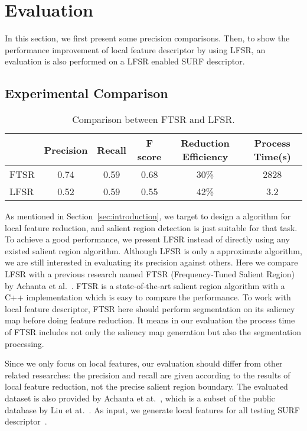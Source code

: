 \section{Evaluation}
\label{sec:evaluation}

In this section, we first present some precision comparisons. Then, to show the performance improvement of local feature descriptor by using LFSR, an evaluation is also performed on a LFSR enabled SURF descriptor.

\subsection{Experimental Comparison}
\label{sec:evaluation_comparison}

\begin{table*}[!t]
\begin{center}
\begin{tabular}{|l|c|c|c|c|c|}
\hline
 & Precision & Recall & F score & Reduction Efficiency & Process Time(s) \\
\hline\hline
FTSR & 0.74 & 0.59 & 0.68 & 30\% & 2828 \\
LFSR & 0.52 & 0.59 & 0.55 & 42\% & 3.2 \\
\hline
\end{tabular}
\end{center}
\caption{Comparison between FTSR and LFSR.}
\label{tab:comparison}
\end{table*}

As mentioned in Section~\ref{sec:introduction}, we target to design a algorithm for local feature reduction, and salient region detection is just suitable for that task. To achieve a good performance, we present LFSR instead of directly using any existed salient region algorithm. Although LFSR is only a approximate algorithm, we are still interested in evaluating its precision against others. Here we compare LFSR with a previous research named FTSR (Frequency-Tuned Salient Region) by Achanta et al.~\cite{achanta2009frequency}. FTSR is a state-of-the-art salient region algorithm with a C++ implementation which is easy to compare the performance. To work with local feature descriptor, FTSR here should perform segmentation on its saliency map before doing feature reduction. It means in our evaluation the process time of FTSR includes not only the saliency map generation but also the segmentation processing.

Since we only focus on local features, our evaluation should differ from other related researches: the precision and recall are given according to the results of local feature reduction, not the precise salient region boundary. The evaluated dataset is also provided by Achanta et at.~\cite{achanta2009frequency}, which is a subset of the public database by Liu et at.~\cite{liu2011learning}. As input, we generate local features for all testing SURF descriptor~\cite{evans2010opensurf}. 

